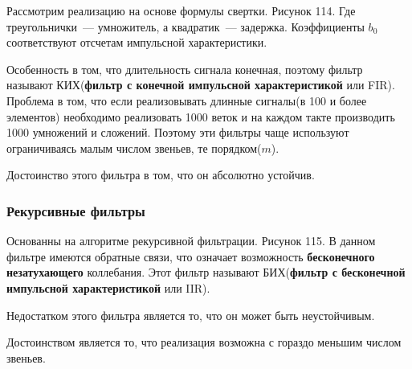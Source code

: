 Рассмотрим реализацию на основе формулы свертки. Рисунок 114. Где треугольнички~--- умножитель, а квадратик~--- задержка. Коэффициенты $b_0$ соответствуют отсчетам импульсной характеристики.

Особенность в том, что длительность сигнала конечная, поэтому фильтр называют КИХ(\textbf{фильтр с конечной импульсной характеристикой} или FIR). Проблема в том, что если реализовывать длинные сигналы(в 100 и более элементов) необходимо реализовать 1000 веток и на каждом такте производить 1000 умножений и сложений. Поэтому эти фильтры чаще используют ограничиваясь малым числом звеньев, те порядком($m$). 

Достоинство этого фильтра в том, что он абсолютно устойчив.

\subsubsection{Рекурсивные фильтры}
Основанны на алгоритме рекурсивной фильтрации. Рисунок 115. В данном фильтре имеются обратные связи, что означает возможность \textbf{бесконечного незатухающего} коллебания. Этот фильтр называют БИХ(\textbf{фильтр с бесконечной импульсной характеристикой} или IIR).

Недостатком этого фильтра является то, что он может быть неустойчивым.

Достоинством является то, что реализация возможна с гораздо меньшим числом звеньев.